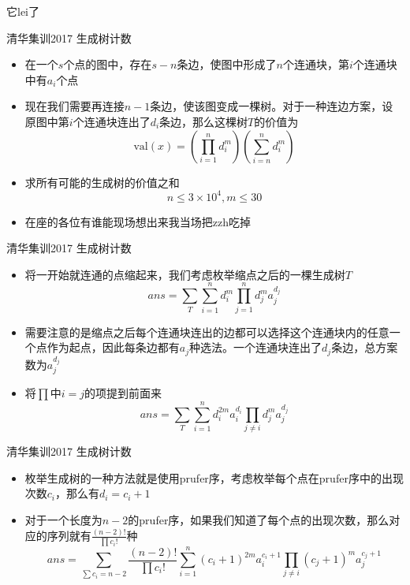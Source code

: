 \documentclass{beamer}
\begin{document}
\begin{frame}{它lei了}
    \begin{block}{清华集训2017 生成树计数}
        \begin{itemize}
            \item 在一个$s$个点的图中，存在$s - n$条边，使图中形成了$n$个连通块，第$i$个连通块中有$a_i$个点
            \item 现在我们需要再连接$n - 1$条边，使该图变成一棵树。对于一种连边方案，设原图中第$i$个连通块连出了$d_i$条边，那么这棵树$T$的价值为
            $$\mathrm{val}(x) = \left(\prod_{i = 1}^n d_i^m\right)\left(\sum_{i = n}^nd_i^m\right)$$
            \item 求所有可能的生成树的价值之和
            $$n\leq 3\times 10^4, m\leq 30$$
            \item 在座的各位有谁能现场想出来我当场把zzh吃掉
        \end{itemize}
    \end{block}
\end{frame}

\begin{frame}{清华集训2017 生成树计数}
    \begin{itemize}
        \item 将一开始就连通的点缩起来，我们考虑枚举缩点之后的一棵生成树$T$ \pause
        $$ans = \sum_{T}\sum_{i = 1}^n d_i^m \prod_{j = 1}^nd_j^m a_j^{d_j}$$ \pause
        \item 需要注意的是缩点之后每个连通块连出的边都可以选择这个连通块内的任意一个点作为起点，因此每条边都有$a_j$种选法。一个连通块连出了$d_j$条边，总方案数为$a_j^{d_j}$ \pause
        \item 将$\prod$中$i = j$的项提到前面来
        $$ans = \sum_{T}\sum_{i = 1}^n d_i^{2m} a_i^{d_i} \prod_{j\neq i} d_j^m a_j^{d_j}$$
    \end{itemize}
\end{frame}

\begin{frame}{清华集训2017 生成树计数}
    \begin{itemize}
        \item 枚举生成树的一种方法就是使用prufer序，考虑枚举每个点在prufer序中的出现次数$c_i$，那么有$d_i = c_i + 1$ \pause
        \item 对于一个长度为$n - 2$的prufer序，如果我们知道了每个点的出现次数，那么对应的序列就有$\frac{(n - 2)!}{\prod c_i!}$种 \pause
        $$ans = \sum_{\sum c_i = n - 2} \frac{(n - 2)!}{\prod c_i!} \sum_{i = 1}^n (c_i + 1)^{2m} a_i^{c_i + 1} \prod_{j\neq i} (c_j + 1)^m a_j^{c_j + 1}$$
    \end{itemize}
\end{frame}
\end{document}
